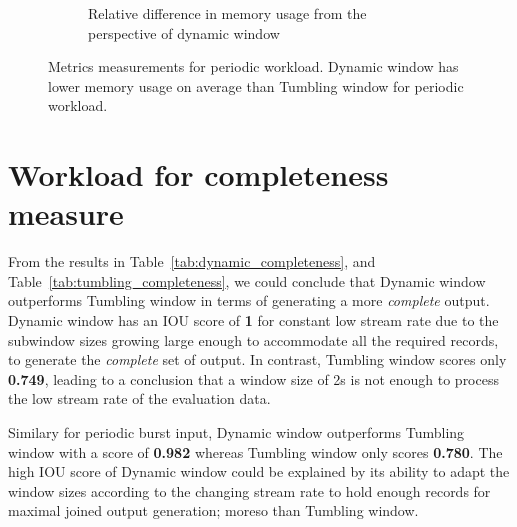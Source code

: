 \begin{figure}
\begin{subfigure}[b]{\columnwidth}
        \caption{Relative difference in memory usage from the perspective of dynamic window}
        \label{fig:periodic_mem_diff}
    \end{subfigure}

    \caption[Metrics measurements for periodic workload]
    {Metrics measurements for periodic workload. Dynamic window 
    has lower memory usage on average than Tumbling window for
periodic workload. }%
    \label{fig:periodic_measurement}
\end{figure}

\newpage
\section{Workload for completeness measure}%
\label{sec:Workload for completeness measure}

From the results in Table~\ref{tab:dynamic_completeness}, and 
Table~\ref{tab:tumbling_completeness}, we could conclude that Dynamic window 
outperforms Tumbling window in terms of generating a more \emph{complete} output. 
Dynamic window has an IOU score of \textbf{1} for constant low stream rate
due to the subwindow sizes growing large 
enough to accommodate all the required records, to generate the \emph{complete} set 
of output. In contrast, Tumbling window scores only \textbf{0.749}, leading to 
a conclusion that a window size of 2s is not enough to process the low stream rate 
of the evaluation data. 

Similary for periodic burst input, Dynamic window outperforms Tumbling window with a
score of \textbf{0.982} whereas Tumbling window only scores \textbf{0.780}. The high IOU 
score of Dynamic window could be explained by its ability to adapt the window sizes according 
to the changing stream rate to hold enough records for maximal joined output generation; moreso 
than Tumbling window. 


\begin{table}[htbp]
    \centering
\caption{Dynamic window's completeness measurement. The \emph{Expected (triples)} are the number of triples generated by the 
bounded data processing RMLStreamer.}
\label{tab:dynamic_completeness}
\end{table}

